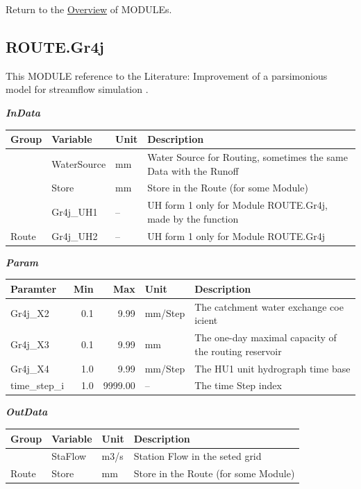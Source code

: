\documentclass[
]{book}
\begin{document}
Return to the \protect\hyperlink{module}{Overview} of MODULEs.

\hypertarget{ROUTE.Gr4j}{%
\subsection{ROUTE.Gr4j}\label{ROUTE.Gr4j}}

This MODULE reference to the Literature: Improvement of a parsimonious model for streamflow simulation \citep{Perrin.2003}.

\textbf{\emph{InData}}

\begin{table}[!h]
\centering
\begin{tabular}{l|l|l|l}
\hline
Group & Variable & Unit & Description\\
\hline
 & WaterSource & mm & Water Source for Routing, sometimes the same Data with the Runoff\\
\cline{2-4}
 & Store & mm & Store in the Route (for some Module)\\
\cline{2-4}
 & Gr4j\_UH1 & -- & UH form 1 only for Module ROUTE.Gr4j, made by the function\\
\cline{2-4}
\multirow{-4}{*}{\raggedright\arraybackslash Route} & Gr4j\_UH2 & -- & UH form 1 only for Module ROUTE.Gr4j\\
\hline
\end{tabular}
\end{table}

\textbf{\emph{Param}}

\begin{table}[!h]
\centering
\begin{tabular}{l|r|r|l|l}
\hline
Paramter & Min & Max & Unit & Description\\
\hline
Gr4j\_X2 & 0.1 & 9.99 & mm/Step & The catchment water exchange coe icient\\
\cline{1-5}
Gr4j\_X3 & 0.1 & 9.99 & mm & The one-day maximal capacity of the routing reservoir\\
\cline{1-5}
Gr4j\_X4 & 1.0 & 9.99 & mm/Step & The HU1 unit hydrograph time base\\
\cline{1-5}
time\_step\_i & 1.0 & 9999.00 & -- & The time Step index\\
\hline
\end{tabular}
\end{table}

\textbf{\emph{OutData}}

\begin{table}[!h]
\centering
\begin{tabular}{l|l|l|l}
\hline
Group & Variable & Unit & Description\\
\hline
 & StaFlow & m3/s & Station Flow in the seted grid\\
\cline{2-4}
\multirow{-2}{*}{\raggedright\arraybackslash Route} & Store & mm & Store in the Route (for some Module)\\
\hline
\end{tabular}
\end{table}
\end{document}
